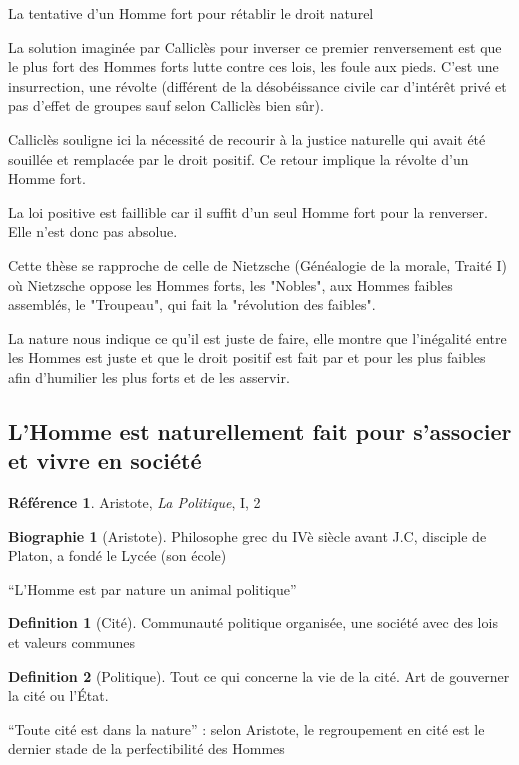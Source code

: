 \documentclass[french]{book}
\theoremstyle{definition}
\newtheorem*{dfn}{Definition}
\newtheorem*{refe}{Référence}
\newtheorem*{bio}{Biographie}
\begin{document}
La tentative d'un Homme fort pour rétablir le droit naturel 

La solution imaginée par Calliclès pour inverser ce premier renversement est que le plus fort des Hommes forts lutte contre ces lois, les foule aux pieds. C'est une insurrection, une révolte (différent de la désobéissance civile car d'intérêt privé et pas d'effet de groupes sauf selon Calliclès bien sûr).

Calliclès souligne ici la nécessité de recourir à la justice naturelle qui avait été souillée et remplacée par le droit positif. Ce retour implique la révolte d'un Homme fort.

La loi positive est faillible car il suffit d'un seul Homme fort pour la renverser. Elle n'est donc pas absolue.

Cette thèse se rapproche de celle de Nietzsche (Généalogie de la morale, Traité I) où Nietzsche oppose les Hommes forts, les "Nobles", aux Hommes faibles assemblés, le "Troupeau", qui fait la "révolution des faibles".

La nature nous indique ce qu'il est juste de faire, elle montre que l'inégalité entre les Hommes est juste et que le droit positif est fait par et pour les plus faibles afin d'humilier les plus forts et de les asservir.

\subsection{L’Homme est naturellement fait pour s’associer et vivre en société}

\begin{refe}
	Aristote, \textit{La Politique}, I, 2
\end{refe}

\begin{bio}[Aristote]
	Philosophe grec du IVè siècle avant J.C, disciple de Platon, a fondé le Lycée (son école)
\end{bio}

“L’Homme est par nature un animal politique”

\begin{dfn}[Cité]
Communauté politique organisée, une société avec des lois et valeurs communes
\end{dfn}

\begin{dfn}[Politique]
Tout ce qui concerne la vie de la cité.
Art de gouverner la cité ou l'État.
\end{dfn}

“Toute cité est dans la nature” : selon Aristote, le regroupement en cité est le dernier stade de la perfectibilité des Hommes
\end{document}
